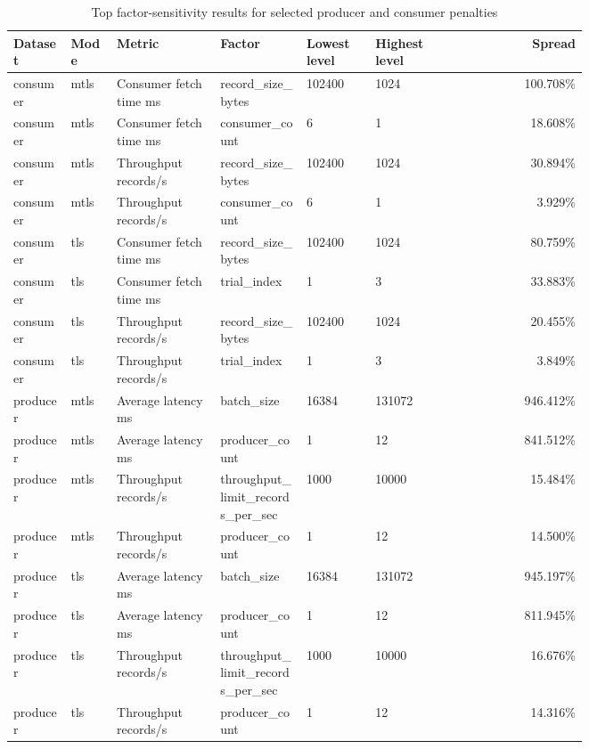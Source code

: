 \begin{table}[H]
\centering
\setlength{\tabcolsep}{4pt}
\renewcommand{\arraystretch}{1.15}
\begin{tabular}{|p{0.10\linewidth}|p{0.08\linewidth}|p{0.18\linewidth}|p{0.15\linewidth}|p{0.12\linewidth}|p{0.12\linewidth}|r|}
\hline
\textbf{Dataset} & \textbf{Mode} & \textbf{Metric} & \textbf{Factor} & \textbf{Lowest level} & \textbf{Highest level} & \textbf{Spread} \\
\hline
consumer & mtls & Consumer fetch time ms & record\_size\_bytes & 102400 & 1024 & 100.708\% \\
consumer & mtls & Consumer fetch time ms & consumer\_count & 6 & 1 & 18.608\% \\
consumer & mtls & Throughput records/s & record\_size\_bytes & 102400 & 1024 & 30.894\% \\
consumer & mtls & Throughput records/s & consumer\_count & 6 & 1 & 3.929\% \\
consumer & tls & Consumer fetch time ms & record\_size\_bytes & 102400 & 1024 & 80.759\% \\
consumer & tls & Consumer fetch time ms & trial\_index & 1 & 3 & 33.883\% \\
consumer & tls & Throughput records/s & record\_size\_bytes & 102400 & 1024 & 20.455\% \\
consumer & tls & Throughput records/s & trial\_index & 1 & 3 & 3.849\% \\
producer & mtls & Average latency ms & batch\_size & 16384 & 131072 & 946.412\% \\
producer & mtls & Average latency ms & producer\_count & 1 & 12 & 841.512\% \\
producer & mtls & Throughput records/s & throughput\_limit\_records\_per\_sec & 1000 & 10000 & 15.484\% \\
producer & mtls & Throughput records/s & producer\_count & 1 & 12 & 14.500\% \\
producer & tls & Average latency ms & batch\_size & 16384 & 131072 & 945.197\% \\
producer & tls & Average latency ms & producer\_count & 1 & 12 & 811.945\% \\
producer & tls & Throughput records/s & throughput\_limit\_records\_per\_sec & 1000 & 10000 & 16.676\% \\
producer & tls & Throughput records/s & producer\_count & 1 & 12 & 14.316\% \\
\hline
\end{tabular}
\caption{Top factor-sensitivity results for selected producer and consumer penalties}
\label{tab:factor-sensitivity-top}
\end{table}
